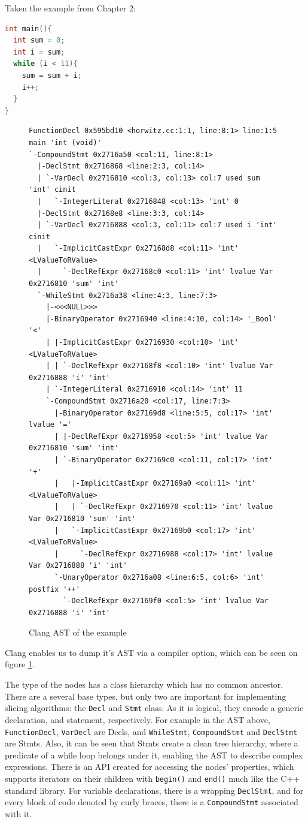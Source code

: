 \documentclass[oneside,12pt,a4paper]{book}
\begin{document}
Taken the example from Chapter 2:
\begin{lstlisting}[language=C++]
int main(){
  int sum = 0;
  int i = sum;
  while (i < 11){
    sum = sum + i;
    i++;
  }
}
\end{lstlisting}
\begin{figure}[h]
\lstset{
xleftmargin=-50pt,
aboveskip=\smallskipamount,
belowskip=\smallskipamount}
\begin{lstlisting}
FunctionDecl 0x595bd10 <horwitz.cc:1:1, line:8:1> line:1:5 main 'int (void)'
`-CompoundStmt 0x2716a50 <col:11, line:8:1>
  |-DeclStmt 0x2716868 <line:2:3, col:14>
  | `-VarDecl 0x2716810 <col:3, col:13> col:7 used sum 'int' cinit
  |   `-IntegerLiteral 0x2716848 <col:13> 'int' 0
  |-DeclStmt 0x27168e8 <line:3:3, col:14>
  | `-VarDecl 0x2716888 <col:3, col:11> col:7 used i 'int' cinit
  |   `-ImplicitCastExpr 0x27168d8 <col:11> 'int' <LValueToRValue>
  |     `-DeclRefExpr 0x27168c0 <col:11> 'int' lvalue Var 0x2716810 'sum' 'int'
  `-WhileStmt 0x2716a38 <line:4:3, line:7:3>
    |-<<<NULL>>>
    |-BinaryOperator 0x2716940 <line:4:10, col:14> '_Bool' '<'
    | |-ImplicitCastExpr 0x2716930 <col:10> 'int' <LValueToRValue>
    | | `-DeclRefExpr 0x27168f8 <col:10> 'int' lvalue Var 0x2716888 'i' 'int'
    | `-IntegerLiteral 0x2716910 <col:14> 'int' 11
    `-CompoundStmt 0x2716a20 <col:17, line:7:3>
      |-BinaryOperator 0x27169d8 <line:5:5, col:17> 'int' lvalue '='
      | |-DeclRefExpr 0x2716958 <col:5> 'int' lvalue Var 0x2716810 'sum' 'int'
      | `-BinaryOperator 0x27169c0 <col:11, col:17> 'int' '+'
      |   |-ImplicitCastExpr 0x27169a0 <col:11> 'int' <LValueToRValue>
      |   | `-DeclRefExpr 0x2716970 <col:11> 'int' lvalue Var 0x2716810 'sum' 'int'
      |   `-ImplicitCastExpr 0x27169b0 <col:17> 'int' <LValueToRValue>
      |     `-DeclRefExpr 0x2716988 <col:17> 'int' lvalue Var 0x2716888 'i' 'int'
      `-UnaryOperator 0x2716a08 <line:6:5, col:6> 'int' postfix '++'
        `-DeclRefExpr 0x27169f0 <col:5> 'int' lvalue Var 0x2716888 'i' 'int'
\end{lstlisting}
\caption{Clang AST of the example}
\label{fig:clang_ast}
\end{figure}

Clang enables us to dump it's AST via a compiler option, which can be seen on figure \ref{fig:clang_ast}.

The type of the nodes has a class hierarchy which has no common ancestor. There are a several base types, but only two are important for implementing slicing algorithms: the \texttt{Decl} and \texttt{Stmt} class. As it is logical, they encode a generic declaration, and statement, respectively. For example in the AST above, \texttt{FunctionDecl}, \texttt{VarDecl} are Decls, and \texttt{WhileStmt}, \texttt{CompoundStmt} and \texttt{DeclStmt} are Stmts. Also, it can be seen that Stmts create a clean tree hierarchy, where a predicate of a while loop belongs under it, enabling the AST to describe complex expressions. There is an API created for accessing the nodes' properties, which supports iterators on their children with \texttt{begin()} and \texttt{end()} much like the C++ standard library. For variable declarations, there is a wrapping \texttt{DeclStmt}, and for every block of code denoted by curly braces, there is a \texttt{CompoundStmt} associated with it. 
\end{document}
